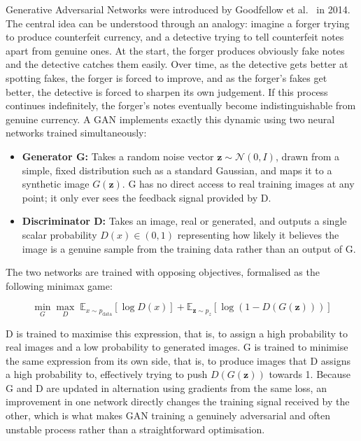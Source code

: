 \documentclass[12pt,a4paper]{article}
\begin{document}
Generative Adversarial Networks were introduced by Goodfellow et al.\ \cite{goodfellow2014}
in 2014. The central idea can be understood through an analogy: imagine a forger trying
to produce counterfeit currency, and a detective trying to tell counterfeit notes apart
from genuine ones. At the start, the forger produces obviously fake notes and the
detective catches them easily. Over time, as the detective gets better at spotting fakes,
the forger is forced to improve, and as the forger's fakes get better, the detective is
forced to sharpen its own judgement. If this process continues indefinitely, the forger's
notes eventually become indistinguishable from genuine currency. A GAN implements exactly
this dynamic using two neural networks trained simultaneously:

\begin{itemize}
    \item \textbf{Generator G:} Takes a random noise vector $\mathbf{z} \sim \mathcal{N}(0, I)$,
          drawn from a simple, fixed distribution such as a standard Gaussian, and maps
          it to a synthetic image $G(\mathbf{z})$. G has no direct access to real training
          images at any point; it only ever sees the feedback signal provided by D.
    \item \textbf{Discriminator D:} Takes an image, real or generated, and outputs a
          single scalar probability $D(x) \in (0, 1)$ representing how likely it believes
          the image is a genuine sample from the training data rather than an output of G.
\end{itemize}

The two networks are trained with opposing objectives, formalised as the following
minimax game:

\begin{equation}
    \min_G \max_D \; \mathbb{E}_{x \sim p_{\text{data}}}[\log D(x)]
    + \mathbb{E}_{\mathbf{z} \sim p_z}[\log(1 - D(G(\mathbf{z})))]
    \label{eq:minimax}
\end{equation}

D is trained to maximise this expression, that is, to assign a high probability to real
images and a low probability to generated images. G is trained to minimise the same
expression from its own side, that is, to produce images that D assigns a high
probability to, effectively trying to push $D(G(\mathbf{z}))$ towards 1. Because G and D
are updated in alternation using gradients from the same loss, an improvement in one
network directly changes the training signal received by the other, which is what makes
GAN training a genuinely adversarial and often unstable process rather than a
straightforward optimisation.
\end{document}
